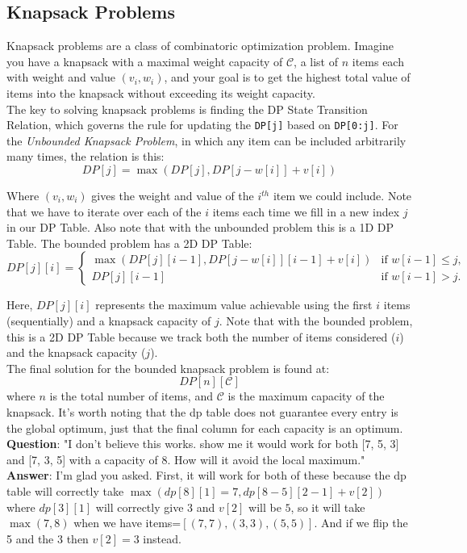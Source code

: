 \documentclass[12pt]{article}
\begin{document}
\subsection{Knapsack Problems}
Knapsack problems are a class of combinatoric optimization problem. Imagine you have a knapsack with a maximal weight capacity of \(\mathcal{C}\), a list of \(n\) items each with weight and value \((v_i, w_i)\), and your goal is to get the highest total value of items into the knapsack without exceeding its weight capacity. \\

The key to solving knapsack problems is finding the DP State Transition Relation, which governs the rule for updating the \texttt{DP[j]} based on \texttt{DP[0:j]}. For the \emph{Unbounded Knapsack Problem}, in which any item can be included arbitrarily many times, the relation is this:
\[DP[j] = \max \left(DP[j], DP[j-w[i]]+v[i]\right)\]

Where \((v_i, w_i)\) gives the weight and value of the \(i^{th}\) item we could include. Note that we have to iterate over each of the \(i\) items each time we fill in a new index \(j\) in our DP Table. Also note that with the unbounded problem this is a 1D DP Table. The bounded problem has a 2D DP Table:
\[
DP[j][i] = 
\begin{cases} 
\max\left(DP[j][i-1], DP[j - w[i]][i-1] + v[i]\right) & \text{if } w[i-1] \leq j, \\
DP[j][i-1] & \text{if } w[i-1] > j.
\end{cases}
\]

Here, \(DP[j][i]\) represents the maximum value achievable using the first \(i\) items (sequentially) and a knapsack capacity of \(j\). Note that with the bounded problem, this is a 2D DP Table because we track both the number of items considered (\(i\)) and the knapsack capacity (\(j\)). \\

The final solution for the bounded knapsack problem is found at:
\[
DP[n][\mathcal{C}]
\]
where \(n\) is the total number of items, and \(\mathcal{C}\) is the maximum capacity of the knapsack. It's worth noting that the dp table does not guarantee every entry is the global optimum, just that the final column for each capacity is an optimum. \\

\textbf{Question}: "I don't believe this works. show me it would work for both [7, 5, 3] and [7, 3, 5] with a capacity of 8. How will it avoid the local maximum." \\
\textbf{Answer}: I'm glad you asked. First, it will work for both of these because the dp table will correctly take \(\max\left(dp[8][1]=7, dp[8-5][2-1]+v[2]\right)\) where \(dp[3][1]\) will correctly give \(3\) and \(v[2]\) will be \(5\), so it will take \(\max(7,8)\) when we have items=\([(7,7),(3,3),(5,5)]\). And if we flip the 5 and the 3 then \(v[2]=3\) instead.
\end{document}
